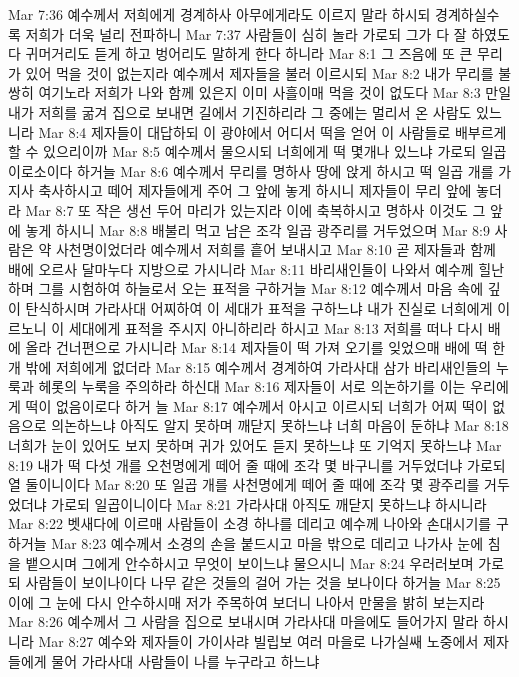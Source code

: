 Mar 7:36  예수께서 저희에게 경계하사 아무에게라도 이르지 말라 하시되 경계하실수록 저희가 더욱 널리 전파하니
Mar 7:37  사람들이 심히 놀라 가로되 그가 다 잘 하였도다 귀머거리도 듣게 하고 벙어리도 말하게 한다 하니라
Mar 8:1  그 즈음에 또 큰 무리가 있어 먹을 것이 없는지라 예수께서 제자들을 불러 이르시되
Mar 8:2  내가 무리를 불쌍히 여기노라 저희가 나와 함께 있은지 이미 사흘이매 먹을 것이 없도다
Mar 8:3  만일 내가 저희를 굶겨 집으로 보내면 길에서 기진하리라 그 중에는 멀리서 온 사람도 있느니라
Mar 8:4  제자들이 대답하되 이 광야에서 어디서 떡을 얻어 이 사람들로 배부르게 할 수 있으리이까
Mar 8:5  예수께서 물으시되 너희에게 떡 몇개나 있느냐 가로되 일곱이로소이다 하거늘
Mar 8:6  예수께서 무리를 명하사 땅에 앉게 하시고 떡 일곱 개를 가지사 축사하시고 떼어 제자들에게 주어 그 앞에 놓게 하시니 제자들이 무리 앞에 놓더라
Mar 8:7  또 작은 생선 두어 마리가 있는지라 이에 축복하시고 명하사 이것도 그 앞에 놓게 하시니
Mar 8:8  배불리 먹고 남은 조각 일곱 광주리를 거두었으며
Mar 8:9  사람은 약 사천명이었더라 예수께서 저희를 흩어 보내시고
Mar 8:10  곧 제자들과 함께 배에 오르사 달마누다 지방으로 가시니라
Mar 8:11  바리새인들이 나와서 예수께 힐난하며 그를 시험하여 하늘로서 오는 표적을 구하거늘
Mar 8:12  예수께서 마음 속에 깊이 탄식하시며 가라사대 어찌하여 이 세대가 표적을 구하느냐 내가 진실로 너희에게 이르노니 이 세대에게 표적을 주시지 아니하리라 하시고
Mar 8:13  저희를 떠나 다시 배에 올라 건너편으로 가시니라
Mar 8:14  제자들이 떡 가져 오기를 잊었으매 배에 떡 한 개 밖에 저희에게 없더라
Mar 8:15  예수께서 경계하여 가라사대 삼가 바리새인들의 누룩과 헤롯의 누룩을 주의하라 하신대
Mar 8:16  제자들이 서로 의논하기를 이는 우리에게 떡이 없음이로다 하거 늘
Mar 8:17  예수께서 아시고 이르시되 너희가 어찌 떡이 없음으로 의논하느냐 아직도 알지 못하며 깨닫지 못하느냐 너희 마음이 둔하냐
Mar 8:18  너희가 눈이 있어도 보지 못하며 귀가 있어도 듣지 못하느냐 또 기억지 못하느냐
Mar 8:19  내가 떡 다섯 개를 오천명에게 떼어 줄 때에 조각 몇 바구니를 거두었더냐 가로되 열 둘이니이다
Mar 8:20  또 일곱 개를 사천명에게 떼어 줄 때에 조각 몇 광주리를 거두었더냐 가로되 일곱이니이다
Mar 8:21  가라사대 아직도 깨닫지 못하느냐 하시니라
Mar 8:22  벳새다에 이르매 사람들이 소경 하나를 데리고 예수께 나아와 손대시기를 구하거늘
Mar 8:23  예수께서 소경의 손을 붙드시고 마을 밖으로 데리고 나가사 눈에 침을 뱉으시며 그에게 안수하시고 무엇이 보이느냐 물으시니
Mar 8:24  우러러보며 가로되 사람들이 보이나이다 나무 같은 것들의 걸어 가는 것을 보나이다 하거늘
Mar 8:25  이에 그 눈에 다시 안수하시매 저가 주목하여 보더니 나아서 만물을 밝히 보는지라
Mar 8:26  예수께서 그 사람을 집으로 보내시며 가라사대 마을에도 들어가지 말라 하시니라
Mar 8:27  예수와 제자들이 가이사랴 빌립보 여러 마을로 나가실쌔 노중에서 제자들에게 물어 가라사대 사람들이 나를 누구라고 하느냐
